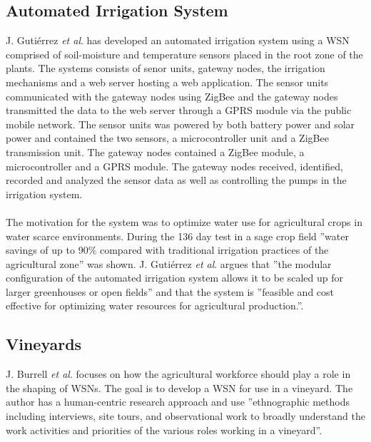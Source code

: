 \documentclass[]{uiophd}
\begin{document}
\subsection{Automated Irrigation System}
J. Gutiérrez \textit{et al}. \cite{6582678} has developed an automated irrigation system using a WSN comprised of soil-moisture and temperature sensors placed in the root zone of the plants. The systems consists of senor units, gateway nodes, the irrigation mechanisms and a web server hosting a web application. The sensor units communicated with the gateway nodes using ZigBee and the gateway nodes transmitted the data to the web server through a GPRS module via the public mobile network. The sensor units was powered by both battery power and solar power and contained the two sensors, a microcontroller unit and a ZigBee transmission unit. The gateway nodes contained a ZigBee module, a microcontroller and a GPRS module. The gateway nodes received, identified, recorded and analyzed the sensor data as well as controlling the pumps in the irrigation system.
\\\\
The motivation for the system was to optimize water use for agricultural crops in water scarce environments. During the 136 day test in a sage crop field ''water savings of up to 90\% compared with traditional irrigation practices of the agricultural zone''\cite{6582678174} was shown. J. Gutiérrez \textit{et al}. argues that ''the modular configuration of the automated irrigation system allows it to be scaled up for larger greenhouses or open fields''\cite{6582678166} and that the system is ''feasible and cost effective for optimizing water resources for agricultural production.''\cite{6582678174}.

\subsection{Vineyards}
J. Burrell \textit{et al}.\cite{1269130} focuses on how the agricultural workforce should play a role in the shaping of WSNs. The goal is to develop a WSN for use in a vineyard. The author has a human-centric research approach and use ''ethnographic methods including interviews, site tours, and observational work to broadly understand the work activities and priorities of the various roles working in a vineyard''\cite{126913038}.
\end{document}
